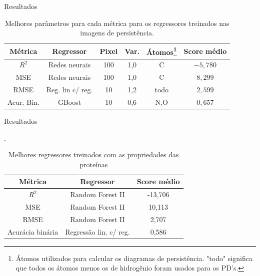 \documentclass[10pt]{beamer}
\begin{document}
\begin{frame}{Resultados}
    \begin{table}[!htbp]
     \centering
     \caption{Melhores parâmetros para cada métrica para os regressores treinados nas imagens de persistência.}
     \label{tab:bestruns}
     \begin{tabular}{@{}cccccc@{}}
     \toprule
     \textbf{Métrica} & \textbf{Regressor} & \textbf{Pixel} & \textbf{Var.} &
     \textbf{Átomos}\footnote{Átomos utilizados para calcular os diagramas de persistência. "todo" significa
     que todos os átomos menos os de hidrogênio foram usados para os PD's.}
      & Score médio
     \\
     \midrule
     $R^2$           & Redes neurais     & 100       & 1,0             & C     & $-5,780$ \\
     MSE             & Redes neurais     & 100       & 1,0             & C     &  $8,299$  \\
     RMSE            & Reg. lin c/ reg.   & 10    & 1,2           & todo  &  $2,599$  \\
         Acur. Bin. & GBoost             & 10      & 0,6             & N,O   &  $0,657$  \\
     \bottomrule
     \end{tabular}
\end{table}
\end{frame}

\begin{frame}{Resultados}
\begin{table}[!htbp]
    \centering
    \caption{Melhores regressores treinados com as propriedades das proteínas}.
    \label{tab:rosregr}
    \begin{tabular}{@{}ccc@{}}
        \toprule
        \textbf{Métrica} & \textbf{Regressor} & \textbf{Score médio} \\ \midrule
        $R^2$           & Random Forest II       &-13,706        \\
        MSE             & Random Forest II       & 10,113         \\
        RMSE            & Random Forest II        & 2,707          \\
        Acurácia binária & Regressão lin. c/ reg. & 0,586          \\ \bottomrule
    \end{tabular}
\end{table}
\end{frame}
\end{document}
